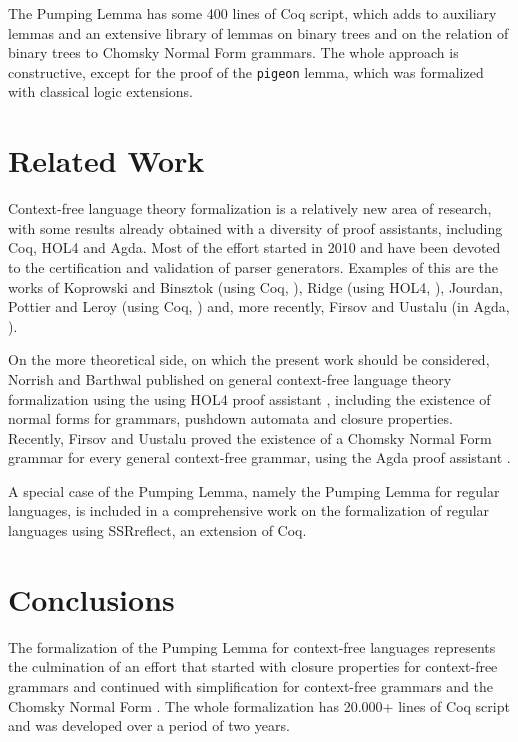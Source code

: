 \documentclass {elsarticle}
\begin{document}
The Pumping Lemma has some 400 lines of Coq script, which adds to auxiliary lemmas and an extensive library of lemmas on binary trees and on the relation of binary trees to Chomsky Normal Form grammars. The whole approach is constructive, except for the proof of the \texttt {pigeon} lemma, which was formalized with classical logic extensions.

\section {Related Work}
\label {sec-related}
Context-free language theory formalization is a relatively new area of research, with some results already obtained with a diversity of proof assistants, including Coq, HOL4 and Agda. Most of the effort started in 2010 and have been devoted to the certification and validation of parser generators. Examples of this are the works of Koprowski and Binsztok (using Coq, \cite {koprowski-2010}), Ridge (using HOL4, \cite {ridge-2011}), Jourdan, Pottier and Leroy (using Coq, \cite {jourdan-2012}) and, more recently, Firsov and Uustalu (in Agda, \cite {firsov-2014}). 

On the more theoretical side, on which the present work should be considered, Norrish and Barthwal published on general context-free language theory formalization using the using HOL4 proof assistant \cite {barthwal-norrish-2010a,barthwal-norrish-2010b,barthwal-norrish-2013}, including the existence of normal forms for grammars, pushdown automata and closure properties. Recently, Firsov and Uustalu proved the existence of a Chomsky Normal Form grammar for every general context-free grammar, using the Agda proof assistant \cite {firsov-2015}.

A special case of the Pumping Lemma, namely the Pumping Lemma for regular languages, is included in a comprehensive work on the formalization of regular languages \cite {doczkal-2013} using SSRreflect, an extension of Coq.

\section {Conclusions}
\label {sec-conclusions}

The formalization of the Pumping Lemma for context-free languages represents the culmination of an effort that started with closure properties for context-free grammars \cite {ramos-2014} and continued with simplification for context-free grammars \cite {ramos-2015} and the Chomsky Normal Form \cite {ramos-2016}. The whole formalization has 20.000+ lines of Coq script and was developed over a period of two years.
\end{document}
